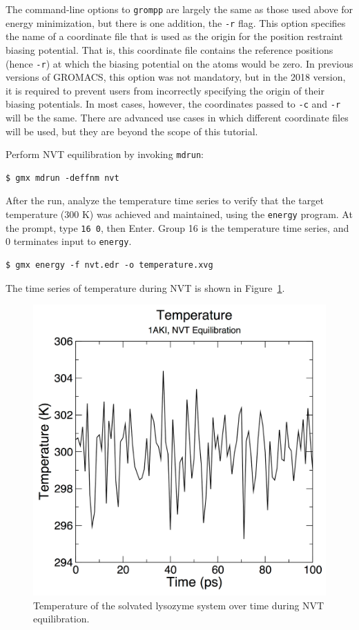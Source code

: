\documentclass[9pt,tutorial,pubversion]{livecoms}
\begin{document}
The command-line options to \texttt{grompp} are largely the same as those used above for energy minimization, but there is one addition, the \texttt{-r} flag. This option specifies the name of a coordinate file that is used as the origin for the position restraint biasing potential. That is, this coordinate file contains the reference positions (hence \texttt{-r}) at which the biasing potential on the atoms would be zero. In previous versions of GROMACS, this option was not mandatory, but in the 2018 version, it is required to prevent users from incorrectly specifying the origin of their biasing potentials. In most cases, however, the coordinates passed to \texttt{-c} and \texttt{-r} will be the same. There are advanced use cases in which different coordinate files will be used, but they are beyond the scope of this tutorial.

Perform NVT equilibration by invoking \texttt{mdrun}:

\begin{lstlisting}
$ gmx mdrun -deffnm nvt
\end{lstlisting}

After the run, analyze the temperature time series to verify that the target temperature (300 K) was achieved and maintained, using the \texttt{energy} program. At the prompt, type \texttt{16 0}, then Enter. Group 16 is the temperature time series, and 0 terminates input to \texttt{energy}.

\begin{lstlisting}
$ gmx energy -f nvt.edr -o temperature.xvg
\end{lstlisting}

The time series of temperature during NVT is shown in Figure~\ref{lyso_nvt_temp_fig}.

\begin{figure}[h]
\centering
\includegraphics{plot_lyso_nvt_temperature}
\caption{Temperature of the solvated lysozyme system over time during NVT equilibration.}
\label{lyso_nvt_temp_fig}
\end{figure}
\end{document}
